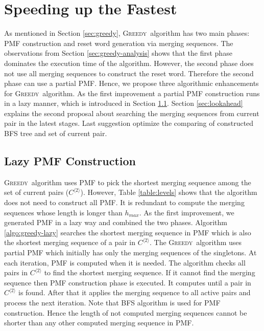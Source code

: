 \documentclass[12pt]{article}
\newcommand{\greedyAlgo}{\textsc{Greedy}}
\begin{document}
\clearpage
\section{Speeding up the Fastest}
\label{sec:speedup}

As mentioned in Section \ref{sec:greedy}, \greedyAlgo\ algorithm has two main phases: PMF construction and reset word generation via merging sequences. The observations from Section \ref{sec:greedy-analysis} shows that the first phase dominates the execution time of the algorithm. However, the second phase does not use all merging sequences to construct the reset word. Therefore the second phase can use a partial PMF. Hence, we propose three algorithmic enhancements for \greedyAlgo\ algorithm. As the first improvement a partial PMF construction runs in a lazy manner, which is introduced in Section \ref{sec:lazy}. Section \ref{sec:lookahead} explains the second proposal about searching the merging sequences from current pair in the latest stages. Last suggestion optimize the comparing of constructed BFS tree and set of current pair.  

\subsection{Lazy PMF Construction}
\label{sec:lazy}

\greedyAlgo\ algorithm uses PMF to pick the shortest merging sequence among the set of current pairs ($C^{\langle2\rangle}$). However, Table \ref{table:levels} shows that the algorithm does not need to construct all PMF. It is redundant to compute the merging sequences whose length is longer than $h_{max}$. As the first improvement, we generated PMF in a lazy way and combined the two phases. Algorithm \ref{algo:greedy-lazy} searches the shortest merging sequence in PMF which is also the shortest merging sequence of a pair in $C^{\langle2\rangle}$. The \greedyAlgo\ algorithm uses partial PMF which initially has only the merging sequences of the singletons. At each iteration, PMF is computed when it is needed. The algorithm checks all pairs in $C^{\langle2\rangle}$ to find the shortest merging sequence. If it cannot find the merging sequence then PMF construction phase is executed. It computes until a pair in $C^{\langle2\rangle}$ is found. After that it applies the merging sequence to all active pairs and process the next iteration. Note that BFS algorithm is used for PMF construction. Hence the length of not computed merging sequences cannot be shorter than any other computed merging sequence in PMF.
 
\end{document}
